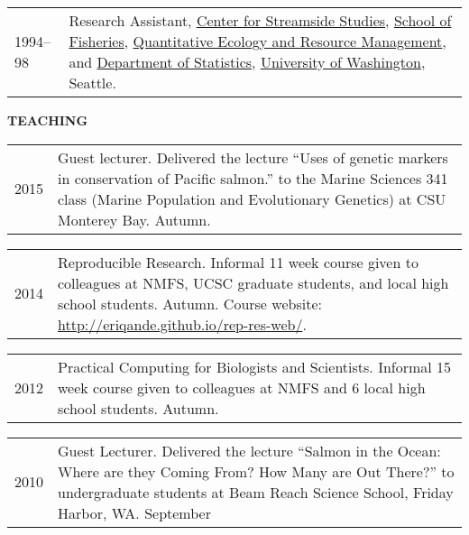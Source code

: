 \documentclass[11pt]{article}
\newlength{\myindent}
\newlength{\postskip}
\newlength{\preskip}
\newlength{\scndcol}
\begin{document}
\begin{tabular}{ @{}p{2.5\myindent} p{\scndcol}@{}  }
\hspace*{\myindent}1994--98 &  Research Assistant, \href{http://depts.washington.edu/cssuw/}{Center for Streamside
Studies},  \href{http://www.fish.washington.edu/}{School of Fisheries}, \href{http://depts.washington.edu/qerm/}{Quantitative Ecology and Resource
Management}, and \href{http://www.stat.washington.edu/}{Department of Statistics}, \href{http://www.washington.edu/}{University of Washington}, Seattle. \\
\end{tabular}
\vspace*{\postskip}


{\bf TEACHING}
\vspace*{\preskip}

\begin{tabular}{ @{}p{2.5\myindent} p{\scndcol}@{}  }
\hspace*{\myindent}2015 &  Guest lecturer. Delivered the lecture ``Uses of genetic markers in conservation
of Pacific salmon.'' to the Marine Sciences 341 class (Marine Population and Evolutionary Genetics) at 
CSU Monterey Bay. Autumn.
\end{tabular}


\begin{tabular}{ @{}p{2.5\myindent} p{\scndcol}@{}  }
\hspace*{\myindent}2014 &  Reproducible Research. Informal 11 week course given to colleagues at NMFS, UCSC graduate students, and local high school students. Autumn.  Course website: \url{http://eriqande.github.io/rep-res-web/}.
\end{tabular}


\begin{tabular}{ @{}p{2.5\myindent} p{\scndcol}@{}  }
\hspace*{\myindent}2012 &  Practical Computing for Biologists and Scientists. Informal 15 week course given to colleagues at NMFS and 6 local high school students. Autumn.
\end{tabular}


\begin{tabular}{ @{}p{2.5\myindent} p{\scndcol}@{}  }
\hspace*{\myindent}2010 &  Guest Lecturer.  Delivered the lecture ``Salmon in the Ocean: Where are they Coming From? 
How Many are Out There?'' to undergraduate students at Beam Reach Science School, Friday Harbor, WA. September
\end{tabular}
\end{document}
